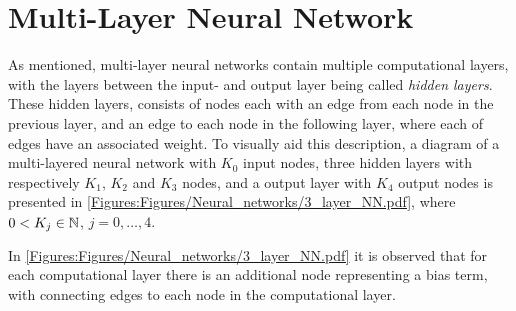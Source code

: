 \section{Multi-Layer Neural Network}
As mentioned, multi-layer neural networks contain multiple computational layers, with the layers between the input- and output layer being called \emph{hidden layers}. These hidden layers, consists of nodes each with an edge from each node in the previous layer, and an edge to each node in the following layer, where each of edges have an associated weight. To visually aid this description, a diagram of a multi-layered neural network with $K_0$ input nodes, three hidden layers with respectively $K_1$, $K_2$ and $K_3$ nodes, and a output layer with $K_4$ output nodes is presented in \autoref{Figures:Figures/Neural_networks/3_layer_NN.pdf}, where $0<K_j \in \mathbb{N}$, $j = 0,\ldots, 4$.


In \autoref{Figures:Figures/Neural_networks/3_layer_NN.pdf} it is observed that for each computational layer there is an additional node representing a bias term, with connecting edges to each node in the computational layer.

